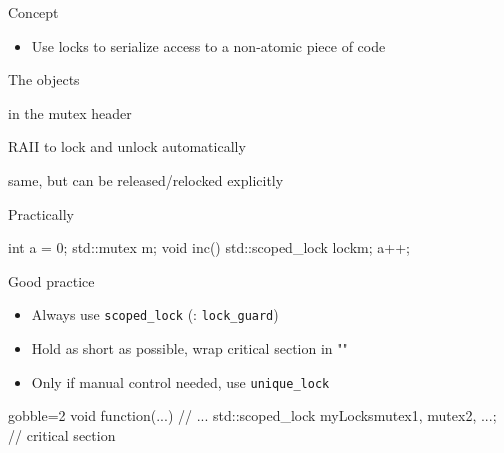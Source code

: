 \begin{frame}[fragile]
  \begin{block}{Concept}
    \begin{itemize}
    \item Use locks to serialize access to a non-atomic piece of code
    \end{itemize}
  \end{block}
  \pause
  \begin{block}{The objects}
    \begin{description}[labelwidth=1.8cm]
    \item[std::mutex] in the mutex header
    \item[std::scoped\_lock] RAII to lock and unlock automatically
    \item[std::unique\_lock] same, but can be released/relocked explicitly
    \end{description}
  \end{block}
  \pause
  \begin{exampleblock}{Practically}
    \begin{cppcode*}{}
      int a = 0;
      std::mutex m;
      void inc() {
        std::scoped_lock lock{m};
        a++;
      }
    \end{cppcode*}
  \end{exampleblock}
\end{frame}

\begin{frame}[fragile]
  \begin{block}{Good practice}
    \begin{itemize}
      \item Always use \texttt{scoped\_lock} (: \texttt{lock\_guard})
      \item Hold as short as possible, wrap critical section in "\texttt{\string{  \string}}"
      \item Only if manual control needed, use \texttt{unique\_lock}
    \end{itemize}
  \end{block}
  \begin{exampleblock}{}
    \begin{cppcode*}{gobble=2}
      void function(...) {
        // ...
        {
          std::scoped_lock myLocks{mutex1, mutex2, ...};
          // critical section
        }
      }
    \end{cppcode*}
  \end{exampleblock}
\end{frame}

